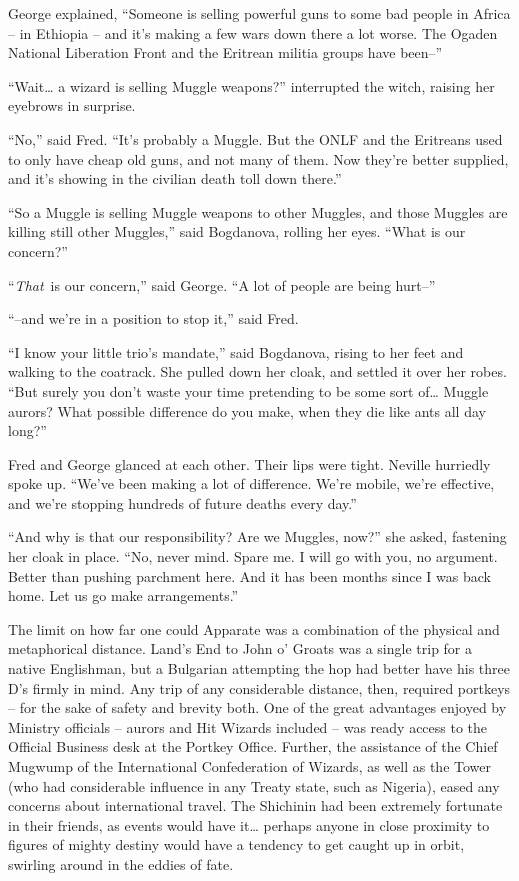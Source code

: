 George explained, ``Someone is selling powerful guns to some bad people
in Africa -- in Ethiopia -- and it's making a few wars down there a lot
worse. The Ogaden National Liberation Front and the Eritrean militia
groups have been--''

``Wait\ldots{} a wizard is selling Muggle weapons?'' interrupted the
witch, raising her eyebrows in surprise.

``No,'' said Fred. ``It's probably a Muggle. But the ONLF and the
Eritreans used to only have cheap old guns, and not many of them. Now
they're better supplied, and it's showing in the civilian death toll
down there.''

``So a Muggle is selling Muggle weapons to other Muggles, and those
Muggles are killing still other Muggles,'' said Bogdanova, rolling her
eyes. ``What is our concern?''

``\emph{That}~is our concern,'' said George. ``A lot of people are being
hurt--''

``--and we're in a position to stop it,'' said Fred.

``I know your little trio's mandate,'' said Bogdanova, rising to her
feet and walking to the coatrack. She pulled down her cloak, and settled
it over her robes. ``But surely you don't waste your time pretending to
be some sort of\ldots{} Muggle aurors? What possible difference do you
make, when they die like ants all day long?''

Fred and George glanced at each other. Their lips were tight. Neville
hurriedly spoke up. ``We've been making a lot of difference. We're
mobile, we're effective, and we're stopping hundreds of future deaths
every day.''

``And why is that our responsibility? Are we Muggles, now?'' she asked,
fastening her cloak in place. ``No, never mind. Spare me. I will go with
you, no argument. Better than pushing parchment here. And it has been
months since I was back home. Let us go make arrangements.''

\mybreak

The limit on how far one could Apparate was a combination of the
physical and metaphorical distance. Land's End to John o' Groats was a
single trip for a native Englishman, but a Bulgarian attempting the hop
had better have his three D's firmly in mind. Any trip of any
considerable distance, then, required portkeys -- for the sake of safety
and brevity both. One of the great advantages enjoyed by Ministry
officials -- aurors and Hit Wizards included -- was ready access to the
Official Business desk at the Portkey Office. Further, the assistance of
the Chief Mugwump of the International Confederation of Wizards, as well
as the Tower (who had considerable influence in any Treaty state, such
as Nigeria), eased any concerns about international travel. The
Shichinin had been extremely fortunate in their friends, as events would
have it\ldots{} perhaps anyone in close proximity to figures of mighty
destiny would have a tendency to get caught up in orbit, swirling around
in the eddies of fate.

